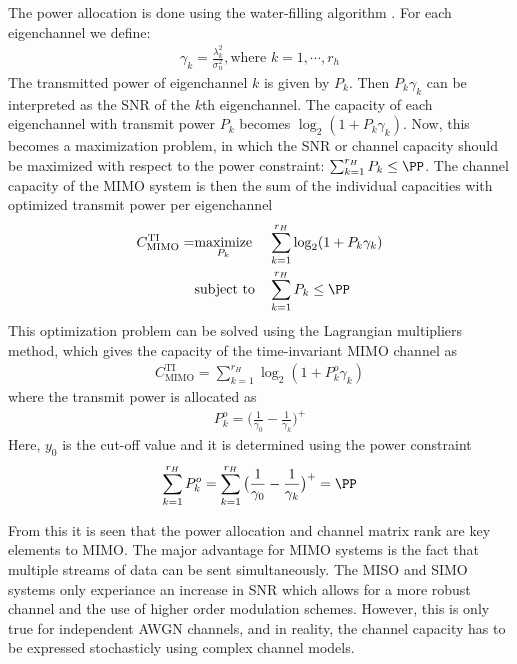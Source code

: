 The power allocation is done using the water-filling algorithm \cite{Tim2012Practical}. For each eigenchannel we define: 
\begin{align}%
  \gamma_k = \frac{\lambda_k^2}{\sigma_n^2}, \text{where } k = 1, \cdots, r_h
\end{align}
The transmitted power of eigenchannel $k$ is given by $P_k$. Then $P_k\gamma_k$ can be interpreted as the SNR of the $k$th eigenchannel. The capacity of each eigenchannel with transmit power $P_k$ becomes $\log_2 (1 + P_k\gamma_k)$. Now, this becomes a maximization problem, in which the SNR or channel capacity should be maximized with respect to the power constraint: $\sum_{k=1}^{r_H} P_k \leq \PP$. 
The channel capacity of the MIMO system is then the sum of the individual capacities with optimized transmit power per eigenchannel \cite{Tim2012Practical}
\begin{equation}%
\begin{aligned}
C^{\text{TI}}_{\text{MIMO}} = 
& \underset{P_k}{\text{maximize}}
& & \sum_{k=1}^{r_H} \log_2 (1 + P_k\gamma_k) \\
& \text{subject to}
& & \sum_{k=1}^{r_H} P_k \leq \PP
\end{aligned}
\end{equation}
This optimization problem can be solved using the Lagrangian multipliers method, which gives the capacity of the time-invariant MIMO channel as \cite{Tim2012Practical} 
\begin{align}%
  C^{\text{TI}}_{\text{MIMO}} = \sum_{k=1}^{r_H} \log_2 (1 + P^o_k\gamma_k)
\end{align}
where the transmit power is allocated as
\begin{align}
  P_k^o = \big(\frac{1}{\gamma_0} - \frac{1}{\gamma_k}\big)^+ 
\end{align}
Here, $y_0$ is the cut-off value and it is determined using the power constraint
\begin{align}%
  \sum_{k=1}^{r_H} P_k^o = \sum_{k=1}^{r_H} \big(\frac{1}{\gamma_0} - \frac{1}{\gamma_k}\big)^+ = \PP
\end{align}

From this it is seen that the power allocation and channel matrix rank are key elements to MIMO. The major advantage for MIMO systems is the fact that multiple streams of data can be sent simultaneously. The MISO and SIMO systems only experiance an increase in SNR which allows for a more robust channel and the use of higher order modulation schemes. However, this is only true for independent AWGN channels, and in reality, the channel capacity has to be expressed stochasticly using complex channel models.  

